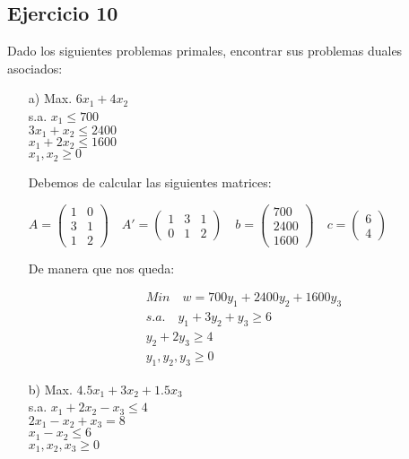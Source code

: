 \subsection*{Ejercicio 10}
Dado los siguientes problemas primales, encontrar sus problemas duales asociados:
\begin{itemize}
    \item[a)] Max. \quad $6x_1 + 4x_2$ \\
    s.a. \quad $x_1 \leq 700$ \\
    \quad \quad $3x_1 + x_2 \leq 2400$ \\
    \quad \quad $x_1 + 2x_2 \leq 1600$ \\
    \quad \quad $x_1, x_2 \geq 0$

    Debemos de calcular las siguientes matrices:
    
    $ A = 
    \begin{pmatrix}
        1 & 0 \\
        3 & 1 \\
        1 & 2
    \end{pmatrix} \quad
    A' = \begin{pmatrix}
        1 & 3 & 1 \\
        0 & 1 & 2
    \end{pmatrix}
    \quad b = \begin{pmatrix}
        700 \\
        2400 \\
        1600
    \end{pmatrix} \quad
    c = \begin{pmatrix}
        6 \\
        4
    \end{pmatrix}
    $

    De manera que nos queda:

    \begin{align*}
        Min \quad w = 700y_1 + 2400y_2 + 1600y_3 \\
        s.a. \quad y_1 + 3y_2 + y_3 \geq 6 \\
        y_2 + 2y_3 \geq 4 \\
        y_1, y_2, y_3 \geq 0
    \end{align*}

    
    
    \item[b)] Max. \quad $4.5x_1 + 3x_2 + 1.5x_3$ \\
    s.a. \quad $x_1 + 2x_2 - x_3 \leq 4$ \\
    \quad \quad $2x_1 - x_2 + x_3 = 8$ \\
    \quad \quad $x_1 - x_2 \leq 6$ \\
    \quad \quad $x_1, x_2, x_3 \geq 0$


\end{itemize}
